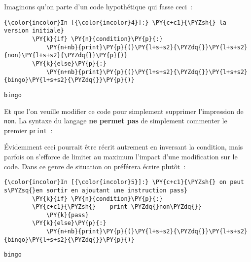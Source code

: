     Imaginons qu'on parte d'un code hypothétique qui fasse ceci~:

    \begin{Verbatim}[commandchars=\\\{\}]
{\color{incolor}In [{\color{incolor}4}]:} \PY{c+c1}{\PYZsh{} la version initiale}
        \PY{k}{if} \PY{n}{condition}\PY{p}{:}
            \PY{n+nb}{print}\PY{p}{(}\PY{l+s+s2}{\PYZdq{}}\PY{l+s+s2}{non}\PY{l+s+s2}{\PYZdq{}}\PY{p}{)}
        \PY{k}{else}\PY{p}{:}
            \PY{n+nb}{print}\PY{p}{(}\PY{l+s+s2}{\PYZdq{}}\PY{l+s+s2}{bingo}\PY{l+s+s2}{\PYZdq{}}\PY{p}{)}
\end{Verbatim}


    \begin{Verbatim}[commandchars=\\\{\}]
bingo

    \end{Verbatim}

    Et que l'on veuille modifier ce code pour simplement supprimer
l'impression de \texttt{non}. La syntaxe du langage \textbf{ne permet
pas} de simplement commenter le premier \texttt{print}~:

\begin{Shaded}
\begin{Highlighting}[]
\NormalTok{:}
     
\end{Highlighting}
\end{Shaded}

    Évidemment ceci pourrait être récrit autrement en inversant la
condition, mais parfois on s'efforce de limiter au maximum l'impact
d'une modification sur le code. Dans ce genre de situation on préférera
écrire plutôt~:

    \begin{Verbatim}[commandchars=\\\{\}]
{\color{incolor}In [{\color{incolor}5}]:} \PY{c+c1}{\PYZsh{} on peut s\PYZsq{}en sortir en ajoutant une instruction pass}
        \PY{k}{if} \PY{n}{condition}\PY{p}{:}
        \PY{c+c1}{\PYZsh{}    print \PYZdq{}non\PYZdq{}}
            \PY{k}{pass}
        \PY{k}{else}\PY{p}{:}
            \PY{n+nb}{print}\PY{p}{(}\PY{l+s+s2}{\PYZdq{}}\PY{l+s+s2}{bingo}\PY{l+s+s2}{\PYZdq{}}\PY{p}{)}
\end{Verbatim}


    \begin{Verbatim}[commandchars=\\\{\}]
bingo

    \end{Verbatim}

